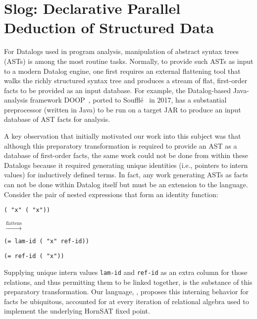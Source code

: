 \section{Slog: Declarative Parallel Deduction of Structured Data}
\label{sec:over}
%
For Datalogs used in program analysis, manipulation of abstract syntax trees (ASTs) is among the most routine tasks.
%
Normally, to provide such ASTs as input to a modern Datalog engine, one first requires an external flattening tool that walks the richly structured syntax tree and produces a stream of flat, first-order facts to be provided as an input database. For example, the Datalog-based Java-analysis framework DOOP~\cite{Bravenboer:2009, 10.1145/1639949.1640108}, ported to Souffl\'e~\cite{antoniadis2017porting} in 2017, has a substantial preprocessor (written in Java) to be run on a target JAR to produce an input database of AST facts for analysis.

A key observation that initially motivated our work into this subject was that although this preparatory
transformation is required to provide an AST as a database of first-order facts,
the same work could not be done from within these Datalogs because it required
generating unique identities (i.e., pointers to intern values) for inductively defined terms. In fact, any work generating ASTs as facts can not be
done within Datalog itself but must be an extension to the language. Consider the pair of nested expressions
that form an identity function:

\begin{multicols}{3}
  \colorbox{white}{\texttt{( "x" ( "x"))}}

  \hspace{0.5cm} $\overset{\text{flattens}}{\longrightarrow}$ %
  
  \begin{minipage}{\linewidth}
  \texttt{(= lam-id ( "x" ref-id))}
  
  \texttt{(= ref-id ( "x"))}
  \end{minipage}
\end{multicols}

Supplying unique intern values \texttt{lam-id} and \texttt{ref-id} as an extra column for those relations, and thus permitting them to be linked together, is the substance of this preparatory transformation. Our language, \slog{}, proposes this interning behavior for facts be ubiquitous, accounted for at every iteration of relational algebra used to implement the underlying HornSAT fixed point. 

